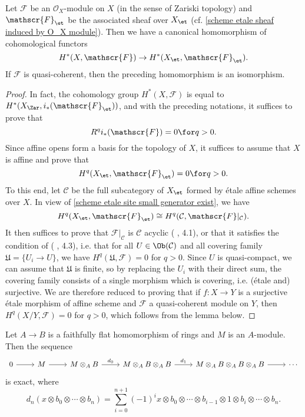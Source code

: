 \begin{proposition}\label{scheme cohomology X_et and X_Zar qcoh isomorphism}
Let $\mathscr{F}$ be an $\mathscr{O}_X$-module on $X$ (in the sense of Zariski topology) and $\mathscr{F}_\et$ be the associated sheaf over $X_\et$ (cf. \cref{scheme etale sheaf induced by O_X module}). Then we have a canonical homomorphism of cohomological functors
\begin{equation}\label{scheme cohomology X_et and X_Zar qcoh isomorphism-1}
H^*(X,\mathscr{F})\to H^*(X_\et,\mathscr{F}_\et).
\end{equation}
If $\mathscr{F}$ is quasi-coherent, then the preceding homomorphism is an isomorphism.
\end{proposition}
\begin{proof}
In fact, the cohomology group $H^*(X,\mathscr{F})$ is equal to $H^*(X_\Zar,i_*(\mathscr{F}_\et))$, and with the preceding notations, it suffices to prove that
\[R^qi_*(\mathscr{F})=0\for q>0.\]
Since affine opens form a basis for the topology of $X$, it suffices to assume that $X$ is affine and prove that
\[H^q(X_\et,\mathscr{F}_\et)=0\for q>0.\]
To this end, let $\mathcal{C}$ be the full subcategory of $X_\et$ formed by \'etale affine schemes over $X$. In view of \cref{scheme etale site small generator exist}, we have
\[H^q(X_\et,\mathscr{F}_\et)\cong H^q(\mathcal{C},\mathscr{F}|_\mathcal{C}).\]
It then suffices to prove that $\mathscr{F}|_\mathcal{C}$ is $\mathcal{C}$ acyclic (\cite{SGA4-1} , 4.1), or that it satisfies the condition of (\cite{SGA4-1} , 4.3), i.e. that for all $U\in\Ob(\mathcal{C})$ and all covering family $\mathfrak{U}=\{U_i\to U\}$, we have $H^q(\mathfrak{U},\mathscr{F})=0$ for $q>0$. Since $U$ is quasi-compact, we can assume that $\mathfrak{U}$ is finite, so by replacing the $U_i$ with their direct sum, the covering family consists of a single morphism which is covering, i.e. (\'etale and) surjective. We are therefore reduced to proving that if $f:X\to Y$ is a surjective \'etale morphism of affine scheme and $\mathscr{F}$ a quasi-coherent module on $Y$, then $H^q(X/Y,\mathscr{F})=0$ for $q>0$, which follows from the lemma below.
\end{proof}
\begin{lemma}\label{scheme etale cohomology of qcoh vanish}
Let $A\to B$ is a faithfully flat homomorphism of rings and $M$ is an $A$-module. Then the sequence
\[\begin{tikzcd}
0\ar[r]&M\ar[r]&M\otimes_AB\ar[r,"d_0"]&M\otimes_AB\otimes_AB\ar[r,"d_1"]&M\otimes_AB\otimes_AB\otimes_AB\ar[r]&\cdots
\end{tikzcd}\]
is exact, where
\[d_n(x\otimes b_0\otimes\cdots\otimes b_n)=\sum_{i=0}^{n+1}(-1)^ix\otimes b_0\otimes\cdots\otimes b_{i-1}\otimes 1\otimes b_i\otimes\cdots\otimes b_n.\]
\end{lemma}
